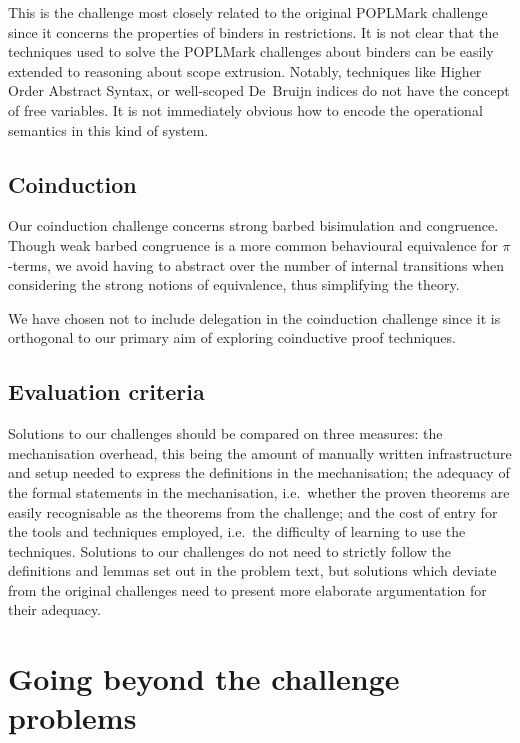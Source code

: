 \documentclass[runningheads]{llncs}
\begin{document}
This is the challenge most closely related to the original POPLMark
challenge since it concerns the properties of binders in restrictions.
It is not clear that the techniques used to solve the POPLMark challenges about binders can be easily extended to reasoning about scope extrusion.
Notably, techniques like Higher Order Abstract Syntax, or well-scoped
De\ Bruijn indices do not have the concept of free variables. It is
not immediately obvious how to encode the operational semantics in
this kind of system.


\subsection{Coinduction}

Our coinduction challenge concerns strong barbed bisimulation and congruence.
Though weak barbed congruence is a more common behavioural equivalence for \(\pi\)-terms, we avoid having to abstract over the number of internal transitions when considering the strong notions of equivalence, thus simplifying the theory.

We have chosen not to include delegation in the coinduction challenge since it is orthogonal to our primary aim of exploring coinductive proof techniques.

\subsection{Evaluation criteria}
Solutions to our challenges should be compared on three measures: the mechanisation overhead, this being the amount of manually written infrastructure and setup needed to express the definitions in the mechanisation; the adequacy of the formal statements in the mechanisation, i.e.\ whether the proven theorems are easily recognisable as the theorems from the challenge; and the cost of entry for the tools and techniques employed, i.e.\ the difficulty of learning to use the techniques.
Solutions to our challenges do not need to strictly follow the definitions and lemmas set out in the problem text, but solutions which deviate from the original challenges need to present more elaborate argumentation for their adequacy.


\section{Going beyond the challenge problems}\label{sec:going-beyond}
\end{document}

